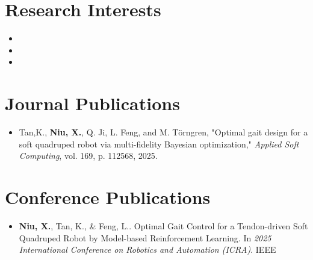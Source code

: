 \documentclass[a4paper,11pt]{article}
\newcommand{\resumeSubHeadingListStart}{\begin{itemize}[leftmargin=*,labelsep=0mm]}
\newcommand{\resumeSubHeadingListEnd}{\end{itemize}\vspace{2mm}}
\begin{document}
\section{\textbf{Research Interests}}
\vspace{-2.5mm}
\begin{multicols}{2}
  \resumeSubHeadingListStart
    \item \hspace{0.5em}{Cyber-Physical Systems}
    \item \hspace{0.5em}{Reinforcement Learning}
    \item \hspace{0.5em}{Control \& Dynamics}
  \resumeSubHeadingListEnd
\vspace{-5.5mm}
\end{multicols}




\section{\textbf{Journal Publications}}
\resumeSubHeadingListStart
  \vspace{3mm}
  \item \hspace{0.3mm} Tan,K., \textbf{Niu, X.}, Q. Ji, L. Feng, and M. Törngren, "Optimal gait design for a soft quadruped robot via multi-fidelity Bayesian optimization," \textit{Applied Soft Computing}, vol. 169, p. 112568, 2025.
  
\resumeSubHeadingListEnd
\vspace{-5.5mm}



\section{\textbf{Conference Publications}}
\resumeSubHeadingListStart
\vspace{3mm}
  \item \hspace{0.3mm} \textbf{Niu, X.}, Tan, K., \& Feng, L.. Optimal Gait Control for a Tendon-driven Soft Quadruped Robot by Model-based Reinforcement Learning. In \textit{2025 International Conference on Robotics and Automation (ICRA)}. IEEE
\resumeSubHeadingListEnd
\vspace{-5.5mm}
\end{document}
